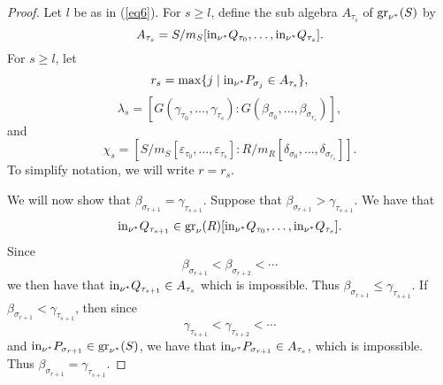 \documentclass[11pt]{amsart}
\let\epsilon\varepsilon
\begin{document}
\begin{proof} Let $l$ be as in (\ref{eq6}). For $s\ge l$, define the sub algebra $A_{\tau_s}$ of ${\rm gr}_{\nu^*}(S)$ by
$$
A_{\tau_s}=S/m_S[{\rm in}_{\nu^*}Q_{\tau_0},\ldots,{\rm in}_{\nu^*}Q_{\tau_s}].
$$
For $s\ge l$, let
$$
r_s=\max\{j\mid {\rm in}_{\nu^*}P_{\sigma_j}\in A_{\tau_s}\},
$$
$$
\lambda_s=[G(\gamma_{\tau_0},\ldots,\gamma_{\tau_s}):G(\beta_{\sigma_0},\ldots,\beta_{\sigma_{r_s}})],
$$
and
$$
\chi_s=[S/m_S[\epsilon_{\tau_0},\ldots,\epsilon_{\tau_s}]:R/m_R[\delta_{\sigma_0},\ldots,\delta_{\sigma_{r_s}}]].
$$
To simplify notation, we will write $r=r_s$. 

We  will now show that $\beta_{\sigma_{r+1}}=\gamma_{\tau_{s+1}}$. 
Suppose that $\beta_{\sigma_{r+1}}>\gamma_{\tau_{s+1}}$.  We have that 
$$
{\rm in}_{\nu^*}Q_{\tau_{s+1}}\in {\rm gr}_{\nu}(R)[{\rm in}_{\nu^*}Q_{\tau_0},\ldots,{\rm in}_{\nu^*}Q_{\tau_s}].
$$
Since
$$
\beta_{\sigma_{r+1}}<\beta_{\sigma_{r+2}}<\cdots
$$
we then have that
${\rm in}_{\nu^*}Q_{\tau_{s+1}}\in A_{\tau_s}$ which is impossible. Thus $\beta_{\sigma_{r+1}}\le \gamma_{\tau_{s+1}}$.
If $\beta_{\sigma_{r+1}}<\gamma_{\tau_{s+1}}$, then since
$$
\gamma_{\tau_{s+1}}<\gamma_{\tau_{s+2}}<\cdots
$$
and ${\rm in}_{\nu^*}P_{\sigma_{r+1}}\in {\rm gr}_{\nu^*}(S)$, we have that ${\rm in}_{\nu^*}P_{\sigma_{r+1}}\in A_{\tau_s}$, which is impossible. Thus
$\beta_{\sigma_{r+1}}=\gamma_{\tau_{s+1}}$.



\end{proof}
\end{document}
